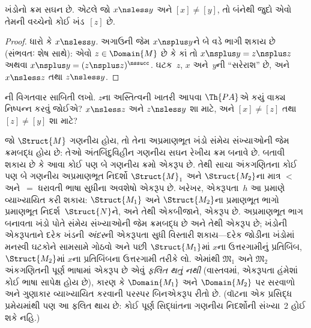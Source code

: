 \begin{prop}
ખંડોનો ક્રમ સઘન છે. એટલે જો $x\nsless y$ અને $[x]\neq[y]$, તો બંનેથી
જુદો એવો તેમની વચ્ચેનો કોઈ ખંડ~$[z]$ છે.
\end{prop}

\begin{proof}
ધારો કે $x\nsless y$. અગાઉની જેમ $x\nsplus y$ને બે વડે ભાગી શકાય છે
(સંભવતઃ શેષ સાથે): એવો $z\in\Domain{M}$ છે કે કાં તો
$x\nsplus y=z\nsplus z$ અથવા
$x\nsplus y=(z\nsplus z)^\nssucc$. ઘટક~$z$, $x$ અને~$y$ની
``સરેરાશ'' છે, અને $x\nsless z$ તથા $z\nsless y$.
\end{proof}

\begin{prob}
ની વિગતવાર સાબિતી લખો.
$z$ના અસ્તિત્વની ખાતરી આપવા $\Th{PA}$એ કયું વાક્ય નિષ્પન્ન
કરવું જોઈએ? $x\nsless z$ અને $z\nsless y$ શા માટે, અને
$[x]\neq[z]$ તથા $[z]\neq[y]$ શા માટે?
\end{prob}

\begin{explain}
જો $\Struct{M}$ ગણનીય હોય, તો તેના અપ્રમાણભૂત ખંડો સંમેય
સંખ્યાઓની જેમ ક્રમબદ્ધ હોય છે: તેઓ અંતબિંદુવિહીન ગણનીય
સઘન રેખીય ક્રમ બનાવે છે. બતાવી શકાય છે કે આવા કોઈ પણ બે
ગણનીય ક્રમો એકરૂપ છે. તેથી સાચા અંકગણિતના કોઈ પણ બે
ગણનીય અપ્રમાણભૂત નિદર્શો $\Struct{M}_1$ અને
$\Struct{M_2}$ના માત્ર $<$ અને~$=$ ધરાવતી ભાષા સુધીના અવશેષો એકરૂપ
છે. ખરેખર, એકરૂપતા~$h$ આ પ્રમાણે વ્યાખ્યાયિત કરી શકાય: $\Struct{M_1}$
અને $\Struct{M_2}$ના પ્રમાણભૂત ભાગો પ્રમાણભૂત નિદર્શ~$\Struct{N}$ને,
અને તેથી એકબીજાને, એકરૂપ છે. અપ્રમાણભૂત ભાગ બનાવતા ખંડો પોતે સંમેય
સંખ્યાઓની જેમ ક્રમબદ્ધ છે અને તેથી એકરૂપ છે; ખંડોની એકરૂપતાને દરેક
ખંડની \emph{અંદર}ની એકરૂપતા સુધી વિસ્તારી શકાય—દરેક જોડીના ખંડોમાં
મનસ્વી ઘટકોને સામસામે ગોઠવો અને પછી $\Struct{M_1}$માં $x$ના
ઉત્તરગામીનું પ્રતિબિંબ, $\Struct{M_2}$માં $x$ના પ્રતિબિંબના ઉત્તરગામી
તરીકે લો. એમાંથી $\mathfrak{M}_1$ અને $\mathfrak{M}_2$ અંકગણિતની
પૂર્ણ ભાષામાં એકરૂપ છે એવું \emph{ફલિત થતું નથી} (વાસ્તવમાં,
એકરૂપતા હંમેશાં કોઈ ભાષા સાપેક્ષ હોય છે), કારણ કે
$\Domain{M_1}$ અને $\Domain{M_2}$ પર સરવાળો અને ગુણાકાર વ્યાખ્યાયિત
કરવાની પરસ્પર બિનએકરૂપ રીતો છે. (વૉટના એક પ્રસિદ્ધ પ્રમેયમાંથી પણ આ
ફલિત થાય છે: કોઈ પૂર્ણ સિદ્ધાંતના ગણનીય નિદર્શોની સંખ્યા~2 હોઈ શકે
નહિ.)
\end{explain}
\endgroup


